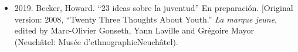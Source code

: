 \begin{itemize} \itemsep -2pt %

%   
%   
%   
%   
% 
%   
%   
		  
  \item 2019. Becker, Howard. ``23 ideas sobre la juventud'' En preparación.
  [Original version: 2008, ``Twenty Three Thoughts About Youth.'' \textit{La marque jeune}, edited by Marc-Olivier Gonseth, Yann Laville and Grégoire Mayor (Neuchâtel: Musée d'ethnographieNeuchâtel).
 

\end{itemize}
